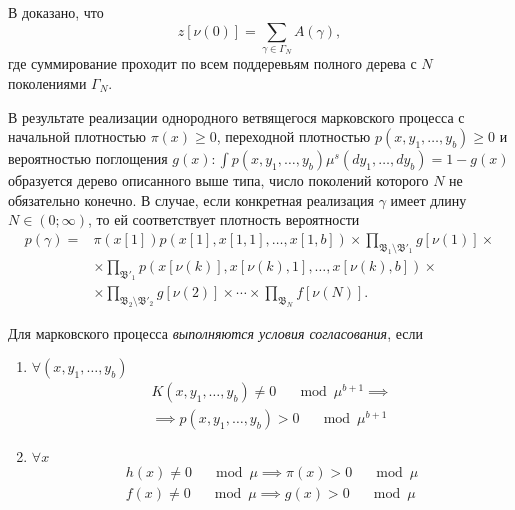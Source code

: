 В \cite{montekarlo1975} доказано, что 
\begin{equation}\label{eq:subtrees}
z\left[\nu(0)\right] = \sum_{\gamma\in\Gamma_N}A\left(\gamma\right),
\end{equation}
где суммирование проходит по всем поддеревьям полного дерева с $N$ поколениями $\Gamma_N$.

В результате реализации однородного ветвящегося марковского процесса с начальной плотностью $\pi\left(x\right) \geq 0$, переходной плотностью $p(x,y_1,\ldots,y_b) \geq 0$ и вероятностью поглощения $g\left(x\right): \int p(x,y_1,\ldots,y_b) \mu^s\left(dy_1, \ldots, dy_b\right) = 1 - g(x)$ образуется дерево описанного выше типа, число поколений которого $N$ не обязательно конечно. В случае, если конкретная реализация $\gamma$ имеет длину $N\in(0;\infty)$, то ей соответствует плотность вероятности
\begin{align*}
	p(\gamma) = &\pi\left(x\left[1\right]\right)p\left(x\left[1\right], x\left[1,1\right], \ldots ,x\left[1,b\right]\right)\times \prod_{\mathfrak{B}_1\setminus\mathfrak{B}'_1}g\left[\nu(1)\right] \times \\
	&\times \prod_{\mathfrak{B}'_1}p\left(x\left[\nu(k)\right], x\left[\nu(k),1\right], \ldots ,x\left[\nu(k),b\right]\right) \times \\
	&\times \prod_{\mathfrak{B}_2\setminus\mathfrak{B}'_2}g\left[\nu(2)\right]\times \cdots \times\prod_{\mathfrak{B}_N}f\left[\nu(N)\right].
\end{align*}

Для марковского процесса \emph{выполняются условия согласования}, если
\begin{enumerate}
 \item $\forall (x,y_1, \ldots, y_b)$ 
$$
\begin{aligned}
K\left(x, y_1, \ldots, y_b\right) \neq 0 \quad \mod \mu^{b+1} \implies \\ \implies p\left(x, y_1, \ldots, y_b\right) > 0 \quad \mod \mu^{b+1}
\end{aligned}$$
\item $\forall x$ $$
\begin{aligned}
h(x) \neq 0\quad \mod \mu \implies \pi(x) > 0\quad \mod \mu \\
f(x) \neq 0\quad \mod \mu \implies g(x) > 0\quad \mod \mu 
\end{aligned}$$
\end{enumerate}

